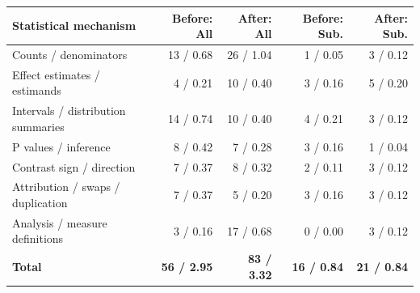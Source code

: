 \begin{tabularx}{\linewidth}{@{}Yrrrr@{}}
\toprule
Statistical mechanism & Before: All & After: All & Before: Sub. & After: Sub. \\
\midrule
Counts / denominators & 13 / 0.68 & 26 / 1.04 & 1 / 0.05 & 3 / 0.12 \\
Effect estimates / estimands & 4 / 0.21 & 10 / 0.40 & 3 / 0.16 & 5 / 0.20 \\
Intervals / distribution summaries & 14 / 0.74 & 10 / 0.40 & 4 / 0.21 & 3 / 0.12 \\
P values / inference & 8 / 0.42 & 7 / 0.28 & 3 / 0.16 & 1 / 0.04 \\
Contrast sign / direction & 7 / 0.37 & 8 / 0.32 & 2 / 0.11 & 3 / 0.12 \\
Attribution / swaps / duplication & 7 / 0.37 & 5 / 0.20 & 3 / 0.16 & 3 / 0.12 \\
Analysis / measure definitions & 3 / 0.16 & 17 / 0.68 & 0 / 0.00 & 3 / 0.12 \\
\midrule
\textbf{Total} & \textbf{56 / 2.95} & \textbf{83 / 3.32} & \textbf{16 / 0.84} & \textbf{21 / 0.84} \\
\bottomrule
\end{tabularx}
